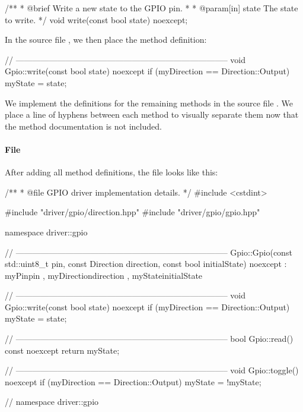 \begin{cppcode}
/**
 * @brief Write a new state to the GPIO pin.
 *
 * @param[in] state The state to write.
 */
void write(const bool state) noexcept;
\end{cppcode}

\noindent In the source file , we then place the method definition:

\begin{cppcode}
// -----------------------------------------------------------------------------
void Gpio::write(const bool state) noexcept
{
    if (myDirection == Direction::Output)
    {
        myState = state;
    }
}
\end{cppcode}

\noindent We implement the definitions for the remaining methods in the source file
. We place a line of hyphens between each method to visually separate
them now that the method documentation is not included.

\paragraph{File }
After adding all method definitions, the file  looks like this:

\begin{cppcode}
/**
 * @file GPIO driver implementation details.
 */
#include <cstdint>

#include "driver/gpio/direction.hpp"
#include "driver/gpio/gpio.hpp"

namespace driver::gpio
{
// -----------------------------------------------------------------------------
Gpio::Gpio(const std::uint8_t pin, const Direction direction, const bool initialState) noexcept
    : myPin{pin}
    , myDirection{direction}
    , myState{initialState}
{}

// -----------------------------------------------------------------------------
void Gpio::write(const bool state) noexcept
{
    if (myDirection == Direction::Output)
    {
        myState = state;
    }
}

// -----------------------------------------------------------------------------
bool Gpio::read() const noexcept { return myState; }

// -----------------------------------------------------------------------------
void Gpio::toggle() noexcept
{
    if (myDirection == Direction::Output)
    {
        myState = !myState;
    }
}
} // namespace driver::gpio
\end{cppcode}

